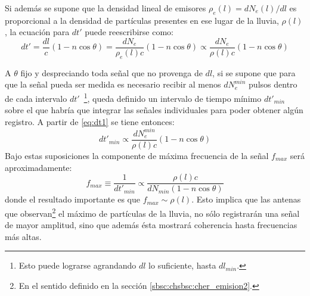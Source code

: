 	Si adem\'as se supone que la densidad lineal de emisores $\rho_e(l) = dN_e(l)/dl$ es proporcional a la densidad de part\'iculas presentes en ese lugar de la lluvia, $\rho(l)$, la ecuaci\'on para $dt'$ puede reescribirse como:
	\begin{equation}
	 dt' = \frac{dl}{c}(1-n\cos\theta) = \frac{dN_e}{\rho_e(l) c}(1-n\cos\theta)\propto \frac{dN_e}{\rho(l) c}(1-n\cos\theta)
	 \label{eq:dt1}
	\end{equation}
	

	A $\theta$ fijo y despreciando toda se\~nal que no provenga de $dl$, si se supone que para que la se\~nal pueda ser medida es necesario recibir al menos $dN_e^{min}$ pulsos dentro de cada intervalo $dt'$~\footnote{Esto puede lograrse agrandando $dl$ lo suficiente, hasta $dl_{min}$.}, queda definido un intervalo de tiempo m\'inimo $dt'_{min}$ sobre el que habr\'ia que integrar las se\~nales individuales para poder obtener alg\'un registro. A partir de \ref{eq:dt1} se tiene entonces:
	\begin{equation}
	 dt'_{min} \propto \frac{dN_e^{min}}{\rho(l) c}(1-n\cos\theta)
	\end{equation}
	Bajo estas suposiciones la componente de m\'axima frecuencia de la se\~nal $f_{max}$  ser\'a aproximadamente:
	\begin{equation}
	 f_{max}\equiv \frac{1}{dt'_{min}} \propto \frac{\rho(l) c}{dN_{min}(1-n\cos\theta)}
	\end{equation}
	donde el resultado importante es que $f_{max}\sim\rho(l)$. 
	Esto implica que las antenas que observan\footnote{En el sentido definido en la secci\'on \ref{sbsc:chsbsc:cher_emision2}.} el m\'aximo de part\'iculas de la lluvia, no s\'olo registrar\'an una se\~nal de mayor amplitud, sino que adem\'as \'esta mostrar\'a coherencia hasta frecuencias m\'as altas.
	
